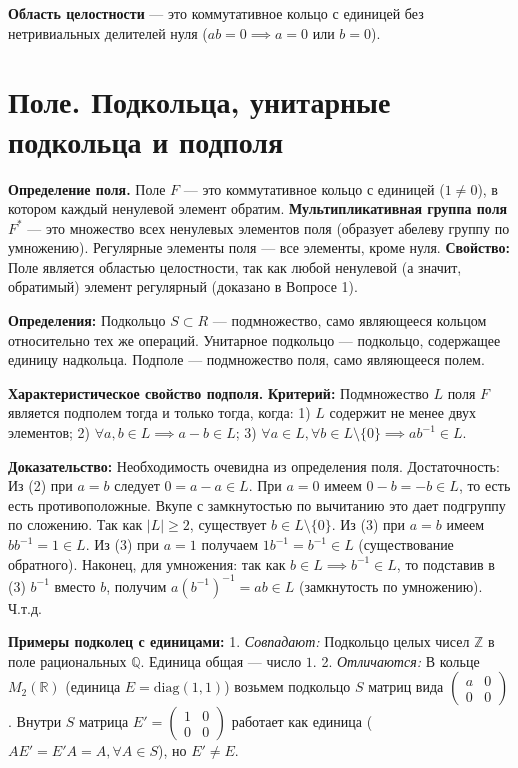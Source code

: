 \documentclass[12pt, a4paper]{article}
\theoremstyle{definition}
\theoremstyle{remark}
\begin{document}
\textbf{Область целостности} — это коммутативное кольцо с единицей без нетривиальных делителей нуля ($ab=0 \implies a=0$ или $b=0$).

\section{Поле. Подкольца, унитарные подкольца и подполя}


\textbf{Определение поля.} Поле $F$ — это коммутативное кольцо с единицей ($1 \neq 0$), в котором каждый ненулевой элемент обратим.
\textbf{Мультипликативная группа поля} $F^*$ — это множество всех ненулевых элементов поля (образует абелеву группу по умножению). Регулярные элементы поля — все элементы, кроме нуля.
\textbf{Свойство:} Поле является областью целостности, так как любой ненулевой (а значит, обратимый) элемент регулярный (доказано в Вопросе 1).

\textbf{Определения:} Подкольцо $S \subset R$ — подмножество, само являющееся кольцом относительно тех же операций. Унитарное подкольцо — подкольцо, содержащее единицу надкольца. Подполе — подмножество поля, само являющееся полем.

\textbf{Характеристическое свойство подполя.}
\textbf{Критерий:} Подмножество $L$ поля $F$ является подполем тогда и только тогда, когда:
1) $L$ содержит не менее двух элементов;
2) $\forall a, b \in L \implies a - b \in L$;
3) $\forall a \in L, \forall b \in L \setminus \{0\} \implies ab^{-1} \in L$.

\textbf{Доказательство:} 
Необходимость очевидна из определения поля.
Достаточность: 
Из (2) при $a=b$ следует $0 = a-a \in L$. 
При $a=0$ имеем $0-b = -b \in L$, то есть есть противоположные. Вкупе с замкнутостью по вычитанию это дает подгруппу по сложению.
Так как $|L| \geq 2$, существует $b \in L \setminus \{0\}$. Из (3) при $a=b$ имеем $b b^{-1} = 1 \in L$.
Из (3) при $a=1$ получаем $1 b^{-1} = b^{-1} \in L$ (существование обратного).
Наконец, для умножения: так как $b \in L \implies b^{-1} \in L$, то подставив в (3) $b^{-1}$ вместо $b$, получим $a (b^{-1})^{-1} = ab \in L$ (замкнутость по умножению). Ч.т.д.

\textbf{Примеры подколец с единицами:}
1. \textit{Совпадают:} Подкольцо целых чисел $\mathbb{Z}$ в поле рациональных $\mathbb{Q}$. Единица общая — число $1$.
2. \textit{Отличаются:} В кольце $M_2(\mathbb{R})$ (единица $E = \text{diag}(1,1)$) возьмем подкольцо $S$ матриц вида $\begin{pmatrix} a & 0 \\ 0 & 0 \end{pmatrix}$. Внутри $S$ матрица $E' = \begin{pmatrix} 1 & 0 \\ 0 & 0 \end{pmatrix}$ работает как единица ($A E' = E' A = A, \forall A \in S$), но $E' \neq E$.
\end{document}
